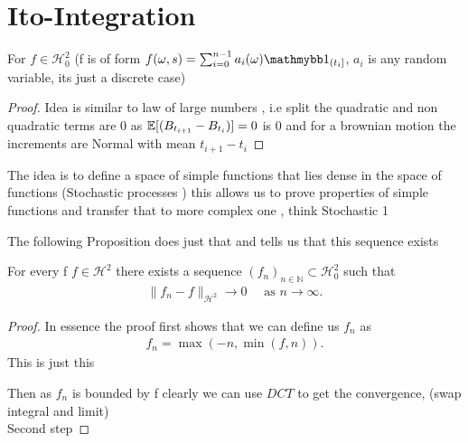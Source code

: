\chapter{Ito-Integration}
\begin{lemma}
  For $f \in  \mathcal{H}_0^2$ (f is of form $f(\omega ,s) = \sum_{i=0}^{n-1} a_i(\omega )\cha_{(t_i]} $, $a_i$ is any random variable, its just 
  a discrete case)   
\end{lemma}
\begin{proof}
  Idea is similar to law of large numbers , i.e split the quadratic and non quadratic terms are 0 as $\mathbb{E}[(B_{t_{i+1}} - B_{t_i})] = 0 $ is 0 and for a brownian motion 
  the increments are Normal with mean $t_{i+1} - t_i$
\end{proof}
\begin{remark}
 The idea is to define a space of simple functions that lies dense in the space of functions (Stochastic processes )  this allows 
 us to prove properties of simple functions and transfer that to more complex one , think Stochastic 1 
\end{remark}
The following Proposition does just that and tells us that this sequence exists
\begin{prop}
  For every f $f \in  \mathcal{H}^2$ there exists a sequence  $(f_n)_{n \in  \mathbb{N}} \subset  \mathcal{H}_0^{2} $ such that 
  \begin{align*}
    \|f_n - f\|_{\mathcal{H}^{2}} \to  0 \quad \text{ as } n\to \infty
  .\end{align*}
\end{prop}
\begin{proof}
 In essence the proof first shows that we can define us $f_n $ as 
 \begin{align*}
  f_n =  \max(-n, \min(f,n))
 .\end{align*}
 This is just this 
\begin{figure}[H]
   \begin{center}
   \end{center}
 \end{figure}
 Then as $f_n$ is bounded by f clearly we can use $DCT$ to get the convergence, (swap integral and limit) \\[1ex]
 Second step 
\end{proof}

